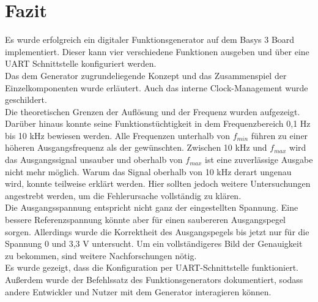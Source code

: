\chapter{Fazit}
Es wurde erfolgreich ein digitaler Funktionsgenerator auf dem Basys 3 Board implementiert.
Dieser kann vier verschiedene Funktionen ausgeben und über eine UART Schnittstelle konfiguriert werden. \\
Das dem Generator zugrundeliegende Konzept und das Zusammenspiel der Einzelkomponenten wurde erläutert.
Auch das interne Clock-Management wurde geschildert. \\
Die theoretischen Grenzen der Auflösung und der Frequenz wurden aufgezeigt. 
Darüber hinaus konnte seine Funktionstüchtigkeit in dem Frequenzbereich 0,1 Hz bis 10 kHz bewiesen werden.
Alle Frequenzen unterhalb von $f_{min}$ führen zu einer höheren Ausgangsfrequenz als der gewünschten.
Zwischen 10 kHz und $f_{max}$ wird das Ausgangssignal unsauber und oberhalb von $f_{max}$ ist eine zuverlässige Ausgabe nicht mehr möglich.
Warum das Signal oberhalb von 10 kHz derart ungenau wird, konnte teilweise erklärt werden.
Hier sollten jedoch weitere Untersuchungen angestrebt werden, um die Fehlerursache vollständig zu klären.\\
Die Ausgangsspannung entspricht nicht ganz der eingestellten Spannung.
Eine bessere Referenzspannung könnte aber für einen saubereren Ausgangspegel sorgen.
Allerdings wurde die Korrektheit des Ausgangspegels bis jetzt nur für die Spannung 0 und 3,3 V untersucht.
Um ein vollständigeres Bild der Genauigkeit zu bekommen, sind weitere Nachforschungen nötig.\\
Es wurde gezeigt, dass die Konfiguration per UART-Schnittstelle funktioniert.
Außerdem wurde der Befehlssatz des Funktionsgenerators dokumentiert, sodass andere Entwickler und Nutzer mit dem Generator interagieren können.
